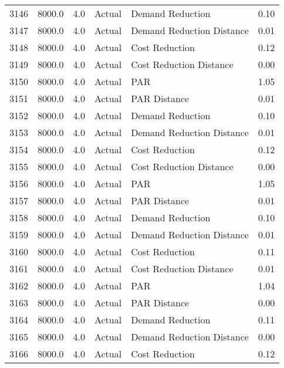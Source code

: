 \begin{longtable}{lrrllr}
3146 &       8000.0 &     4.0 &         Actual &           Demand Reduction &   0.10 \\
3147 &       8000.0 &     4.0 &         Actual &  Demand Reduction Distance &   0.01 \\
3148 &       8000.0 &     4.0 &         Actual &             Cost Reduction &   0.12 \\
3149 &       8000.0 &     4.0 &         Actual &    Cost Reduction Distance &   0.00 \\
3150 &       8000.0 &     4.0 &         Actual &                        PAR &   1.05 \\
3151 &       8000.0 &     4.0 &         Actual &               PAR Distance &   0.01 \\
3152 &       8000.0 &     4.0 &         Actual &           Demand Reduction &   0.10 \\
3153 &       8000.0 &     4.0 &         Actual &  Demand Reduction Distance &   0.01 \\
3154 &       8000.0 &     4.0 &         Actual &             Cost Reduction &   0.12 \\
3155 &       8000.0 &     4.0 &         Actual &    Cost Reduction Distance &   0.00 \\
3156 &       8000.0 &     4.0 &         Actual &                        PAR &   1.05 \\
3157 &       8000.0 &     4.0 &         Actual &               PAR Distance &   0.01 \\
3158 &       8000.0 &     4.0 &         Actual &           Demand Reduction &   0.10 \\
3159 &       8000.0 &     4.0 &         Actual &  Demand Reduction Distance &   0.01 \\
3160 &       8000.0 &     4.0 &         Actual &             Cost Reduction &   0.11 \\
3161 &       8000.0 &     4.0 &         Actual &    Cost Reduction Distance &   0.01 \\
3162 &       8000.0 &     4.0 &         Actual &                        PAR &   1.04 \\
3163 &       8000.0 &     4.0 &         Actual &               PAR Distance &   0.00 \\
3164 &       8000.0 &     4.0 &         Actual &           Demand Reduction &   0.11 \\
3165 &       8000.0 &     4.0 &         Actual &  Demand Reduction Distance &   0.00 \\
3166 &       8000.0 &     4.0 &         Actual &             Cost Reduction &   0.12 \\

\end{longtable}
